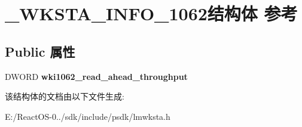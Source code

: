 \hypertarget{struct___w_k_s_t_a___i_n_f_o__1062}{}\section{\+\_\+\+W\+K\+S\+T\+A\+\_\+\+I\+N\+F\+O\+\_\+1062结构体 参考}
\label{struct___w_k_s_t_a___i_n_f_o__1062}
\subsection*{Public 属性}
\begin{DoxyCompactItemize}
\item 
\mbox{\label{struct___w_k_s_t_a___i_n_f_o__1062_a5bd703be1dd9cafddcd7bddc7e06c3ab}} 
D\+W\+O\+RD {\bfseries wki1062\+\_\+read\+\_\+ahead\+\_\+throughput}
\end{DoxyCompactItemize}


该结构体的文档由以下文件生成\+:\begin{DoxyCompactItemize}
\item 
E\+:/\+React\+O\+S-\/0../sdk/include/psdk/lmwksta.\+h\end{DoxyCompactItemize}
